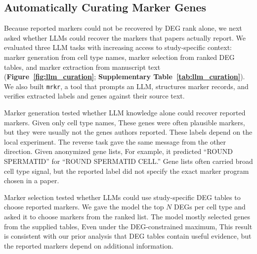 \documentclass[10pt,twocolumn]{article}
\theoremstyle{plain}
\theoremstyle{definition}
\theoremstyle{remark}
\begin{document}
\subsection*{Automatically Curating Marker Genes}

Because reported markers could not be recovered by DEG rank alone, we next asked whether LLMs could recover the markers that papers actually report. We evaluated three LLM tasks with increasing access to study-specific context: marker generation from cell type names, marker selection from ranked DEG tables, and marker extraction from manuscript text (\textbf{Figure~\ref{fig:llm_curation}}; \textbf{Supplementary Table~\ref{tab:llm_curation}}). We also built \texttt{mrkr}, a tool that prompts an LLM, structures marker records, and verifies extracted labels and genes against their source text.

Marker generation tested whether LLM knowledge alone could recover reported markers. Given only cell type names,  These genes were often plausible markers, but they were usually not the genes authors reported.  These labels depend on the local experiment. The reverse task gave the same message from the other direction. Given anonymized gene lists,  For example, it predicted ``ROUND SPERMATID'' for ``ROUND SPERMATID CELL.'' Gene lists often carried broad cell type signal, but the reported label did not specify the exact marker program chosen in a paper.

Marker selection tested whether LLMs could use study-specific DEG tables to choose reported markers. We gave the model the top $N$ DEGs per cell type and asked it to choose markers from the ranked list. The model mostly selected genes from the supplied tables,  Even under the DEG-constrained maximum,  This result is consistent with our prior analysis that DEG tables contain useful evidence, but the reported markers depend on additional information.
\end{document}
